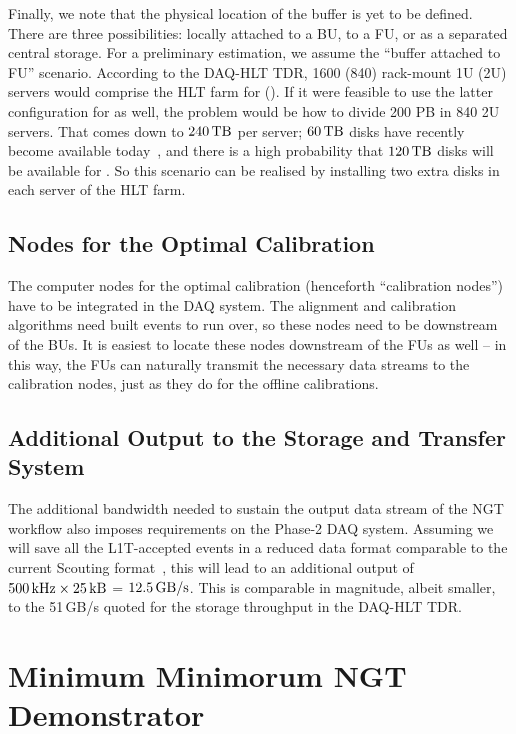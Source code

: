 Finally, we note that the physical location of the buffer is yet to be defined.
There are three possibilities: 
locally attached to a BU, to a FU, or as a separated central storage.
For a preliminary estimation, we assume the ``buffer attached to FU'' scenario.
According to the DAQ-HLT TDR,
1600 (840) rack-mount 1U (2U) servers would comprise the HLT farm for \Runfour (\Runfive).
If it were feasible to use the latter configuration for \Runfour as well,
the problem would be how to divide 200 PB in 840 2U servers.
That comes down to  $240\,\text{TB}$ per server; $60\,\text{TB}$ disks have recently become available today~\cite{micron60tb},
and there is a high probability that $120\,\text{TB}$ disks will be available for \Runfour.
So this scenario can be realised by installing two extra disks in each server of the HLT farm.

\subsection{Nodes for the Optimal Calibration}

The computer nodes for the optimal calibration (henceforth ``calibration nodes'') have to be integrated in the DAQ system.
The alignment and calibration algorithms need built events to run over, so these nodes need to be downstream of the BUs.
It is easiest to locate these nodes downstream of the FUs as well --
in this way, the FUs can naturally transmit the necessary data streams to the calibration nodes, 
just as they do for the offline calibrations.

\subsection{Additional Output to the Storage and Transfer System}

The additional bandwidth needed to sustain the output data stream of the NGT workflow also imposes requirements on the Phase-2 DAQ system.
Assuming we will save all the L1T-accepted events in a reduced data format comparable to the current Scouting format~\cite{CMS:2024zhe},
this will lead to an additional output of $500\,\text{kHz} 
\times 25\,\text{kB}$ = $12.5\,\text{GB/s}$.
This is comparable in magnitude, albeit smaller, to the 51\,GB/s quoted for the storage throughput in the DAQ-HLT TDR.

\section{Minimum Minimorum NGT Demonstrator}

